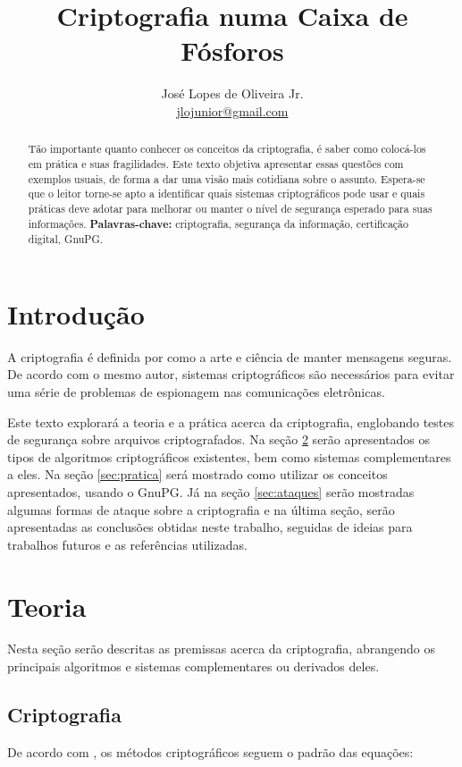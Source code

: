 \documentclass[12px,a4paper,twoside]{article}
\title{Criptografia numa Caixa de Fósforos}
\author{José Lopes de Oliveira Jr.\\
{\small \href{mailto:jlojunior@gmail.com}{jlojunior@gmail.com}}}
\begin{document}
\maketitle
\begin{abstract}
\noindent Tão importante quanto conhecer os conceitos da criptografia, é saber 
como colocá-los em prática e suas fragilidades.  Este texto objetiva apresentar 
essas questões com exemplos usuais, de forma a dar uma visão mais cotidiana 
sobre o assunto.  Espera-se que o leitor torne-se apto a identificar quais 
sistemas criptográficos pode usar e quais práticas deve adotar para melhorar ou 
manter o nível de segurança esperado para suas informações.
\newline\newline
\noindent \textbf{Palavras-chave:} criptografia, segurança da informação, 
certificação digital, GnuPG.
\end{abstract}


\section{Introdução}
\label{sec:intro}

A criptografia é definida por \cite{uchoa} como a arte e ciência de manter 
mensagens seguras.  De acordo com o mesmo autor, sistemas criptográficos são 
necessários para evitar uma série de problemas de espionagem nas comunicações 
eletrônicas.

Este texto explorará a teoria e a prática acerca da criptografia, englobando 
testes de segurança sobre arquivos criptografados.  Na seção \ref{sec:teoria}
serão apresentados os tipos de algoritmos criptográficos existentes, bem como
sistemas complementares a eles.  Na seção \ref{sec:pratica} será mostrado como
utilizar os conceitos apresentados, usando o GnuPG.  Já na seção
\ref{sec:ataques} serão mostradas algumas formas de ataque sobre a criptografia
e na última seção, serão apresentadas as conclusões obtidas neste trabalho,
seguidas de ideias para trabalhos futuros e as referências utilizadas.


\section{Teoria}
\label{sec:teoria}

Nesta seção serão descritas as premissas acerca da criptografia, abrangendo os
principais algoritmos e sistemas complementares ou derivados deles.

\subsection{Criptografia}
\label{sec:teoria:criptografia}
De acordo com \cite{tanenbaum:1}, os métodos criptográficos seguem o padrão das
equações:
\end{document}
